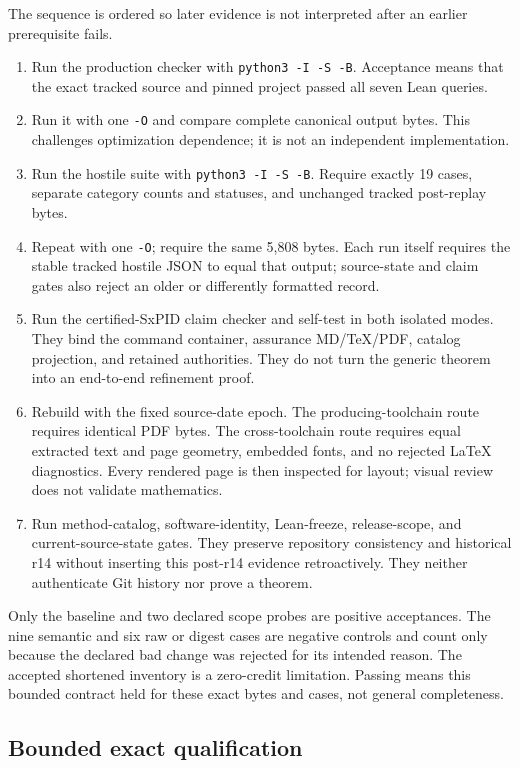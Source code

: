 \documentclass[11pt]{article}
\theoremstyle{definition}
\begin{document}
The sequence is ordered so later evidence is not interpreted after an earlier prerequisite fails.
\begin{enumerate}
  \item Run the production checker with \texttt{python3 -I -S -B}.  Acceptance means that the exact
  tracked source and pinned project passed all seven Lean queries.
  \item Run it with one \texttt{-O} and compare complete canonical output bytes.  This challenges
  optimization dependence; it is not an independent implementation.
  \item Run the hostile suite with \texttt{python3 -I -S -B}.  Require exactly 19 cases, separate
  category counts and statuses, and unchanged tracked post-replay bytes.
  \item Repeat with one \texttt{-O}; require the same 5,808 bytes.  Each run itself requires the
  stable tracked hostile JSON to equal that output; source-state and claim gates also reject an
  older or differently formatted record.
  \item Run the certified-SxPID claim checker and self-test in both isolated modes.  They bind the
  command container, assurance MD/TeX/PDF, catalog projection, and retained authorities.  They do
  not turn the generic theorem into an end-to-end refinement proof.
  \item Rebuild with the fixed source-date epoch.  The producing-toolchain route requires identical
  PDF bytes.  The cross-toolchain route requires equal extracted text and page geometry, embedded
  fonts, and no rejected LaTeX diagnostics.  Every rendered page is then inspected for layout;
  visual review does not validate mathematics.
  \item Run method-catalog, software-identity, Lean-freeze, release-scope, and current-source-state
  gates.  They preserve repository consistency and historical r14 without inserting this post-r14
  evidence retroactively.  They neither authenticate Git history nor prove a theorem.
\end{enumerate}

Only the baseline and two declared scope probes are positive acceptances.  The nine semantic and six
raw or digest cases are negative controls and count only because the declared bad change was
rejected for its intended reason.  The accepted shortened inventory is a zero-credit limitation.
Passing means this bounded contract held for these exact bytes and cases, not general completeness.

\subsection{Bounded exact qualification}
\end{document}
